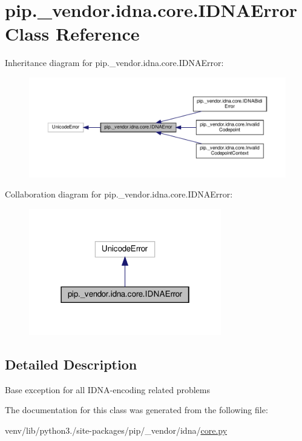 \hypertarget{classpip_1_1__vendor_1_1idna_1_1core_1_1IDNAError}{}\section{pip.\+\_\+vendor.\+idna.\+core.\+I\+D\+N\+A\+Error Class Reference}
\label{classpip_1_1__vendor_1_1idna_1_1core_1_1IDNAError}


Inheritance diagram for pip.\+\_\+vendor.\+idna.\+core.\+I\+D\+N\+A\+Error\+:
\nopagebreak
\begin{figure}[H]
\begin{center}
\leavevmode
\includegraphics[width=350pt]{classpip_1_1__vendor_1_1idna_1_1core_1_1IDNAError__inherit__graph}
\end{center}
\end{figure}


Collaboration diagram for pip.\+\_\+vendor.\+idna.\+core.\+I\+D\+N\+A\+Error\+:
\nopagebreak
\begin{figure}[H]
\begin{center}
\leavevmode
\includegraphics[width=238pt]{classpip_1_1__vendor_1_1idna_1_1core_1_1IDNAError__coll__graph}
\end{center}
\end{figure}


\subsection{Detailed Description}
\begin{DoxyVerb}Base exception for all IDNA-encoding related problems \end{DoxyVerb}
 

The documentation for this class was generated from the following file\+:\begin{DoxyCompactItemize}
\item 
venv/lib/python3./site-\/packages/pip/\+\_\+vendor/idna/\hyperlink{pip_2__vendor_2idna_2core_8py}{core.\+py}\end{DoxyCompactItemize}
